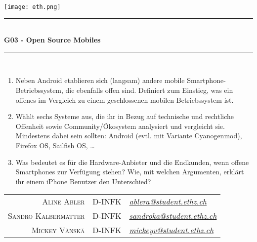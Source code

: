 \begin{titlepage}

	\begin{flushright}
		{\texttt{[image: eth.png]}}
	\end{flushright}
	
	\begin{center}
		\vspace*{2\baselineskip}
		\rule{\linewidth}{0.5mm} \\[3mm]
		\textbf{\huge G03 - Open Source Mobiles} \\
		\rule{\linewidth}{0.5mm} \\
		\vspace{\baselineskip}
	\end{center}
	
	\begin{large}
	
		\begin{enumerate}[leftmargin=*]
		    \item Neben Android etablieren sich (langsam) andere mobile Smartphone-Betriebssystem, die ebenfalls offen sind. Definiert zum Einstieg, was ein offenes im Vergleich zu einem geschlossenen mobilen Betriebssystem ist.
	
		    \item Wählt sechs Systeme aus, die ihr in Bezug auf technische und rechtliche Offenheit sowie Community/Ökosystem analysiert und vergleicht sie. Mindestens dabei sein sollten: Android (evtl{.} mit Variante Cyanogenmod), Firefox OS, Sailfish OS, \ldots
	
		    \item Was bedeutet es für die Hardware-Anbieter und die Endkunden, wenn offene Smartphones zur Verfügung stehen? Wie, mit welchen Argumenten, erklärt ihr einem iPhone Benutzer den Unterschied?
		\end{enumerate}
	
		\begin{center}
		
			\vfill
			\begin{tabular}{r@{, }c@{, }l}
				\textsc{Aline Abler} &D-INFK & \href{mailto:ablera@student.ethz.ch}{\emph{ablera@student.ethz.ch}} \\
				\textsc{Sandro Kalbermatter} &D-INFK & \href{mailto:sandroka@student.ethz.ch}{\emph{sandroka@student.ethz.ch}} \\
				\textsc{Mickey Vänskä} & D-INFK & \href{mailto:mickeyv@student.ethz.ch}{\emph{mickeyv@student.ethz.ch}} \\
			\end{tabular}
			\vspace{2\baselineskip}
	

\end{center}
\end{large}
\end{titlepage}
